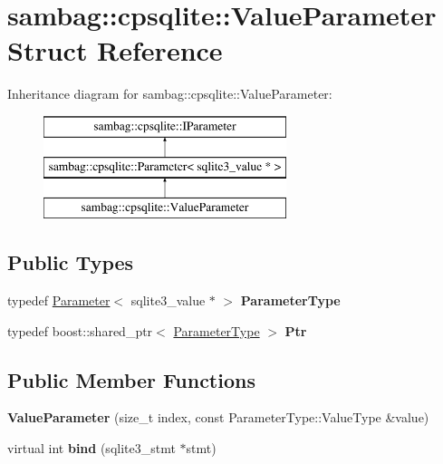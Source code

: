 \hypertarget{structsambag_1_1cpsqlite_1_1_value_parameter}{
\section{sambag::cpsqlite::ValueParameter Struct Reference}
\label{structsambag_1_1cpsqlite_1_1_value_parameter}
}
Inheritance diagram for sambag::cpsqlite::ValueParameter:\begin{figure}[H]
\begin{center}
\leavevmode
\includegraphics[height=3.000000cm]{structsambag_1_1cpsqlite_1_1_value_parameter}
\end{center}
\end{figure}
\subsection*{Public Types}
\begin{DoxyCompactItemize}
\item 
\hypertarget{structsambag_1_1cpsqlite_1_1_value_parameter_a22145873cc6cf8c9e3d13c3ecdea1bbb}{
typedef \hyperlink{structsambag_1_1cpsqlite_1_1_parameter}{Parameter}$<$ sqlite3\_\-value $\ast$ $>$ {\bfseries ParameterType}}
\label{structsambag_1_1cpsqlite_1_1_value_parameter_a22145873cc6cf8c9e3d13c3ecdea1bbb}

\item 
\hypertarget{structsambag_1_1cpsqlite_1_1_value_parameter_adbdeec663d7879571f2e18cf0e6e9085}{
typedef boost::shared\_\-ptr$<$ \hyperlink{structsambag_1_1cpsqlite_1_1_parameter}{ParameterType} $>$ {\bfseries Ptr}}
\label{structsambag_1_1cpsqlite_1_1_value_parameter_adbdeec663d7879571f2e18cf0e6e9085}

\end{DoxyCompactItemize}
\subsection*{Public Member Functions}
\begin{DoxyCompactItemize}
\item 
\hypertarget{structsambag_1_1cpsqlite_1_1_value_parameter_aa10c7bc0642f33888e2bc76e4ba29bc4}{
{\bfseries ValueParameter} (size\_\-t index, const ParameterType::ValueType \&value)}
\label{structsambag_1_1cpsqlite_1_1_value_parameter_aa10c7bc0642f33888e2bc76e4ba29bc4}

\item 
\hypertarget{structsambag_1_1cpsqlite_1_1_value_parameter_a1dbb7d0bc4a89efe5af85fc7ac7169e0}{
virtual int {\bfseries bind} (sqlite3\_\-stmt $\ast$stmt)}
\label{structsambag_1_1cpsqlite_1_1_value_parameter_a1dbb7d0bc4a89efe5af85fc7ac7169e0}

\end{DoxyCompactItemize}
